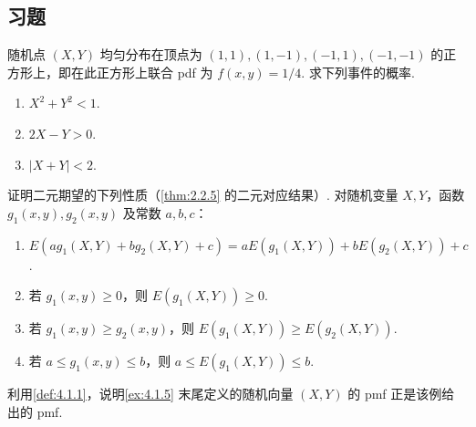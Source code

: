 \subsection{习题}\label{sec:4.8}
\setcounter{exercise}{0}
\begin{exercise}\label{exercise:4.1}
随机点 $(X,Y)$ 均匀分布在顶点为 $(1,1),(1,-1),(-1,1),(-1,-1)$ 的正方形上，即在此正方形上联合 pdf 为 $f(x,y)=1/4$. 求下列事件的概率.
\begin{enumerate}
\item[(a)] $X^2+Y^2<1$.
\item[(b)] $2X-Y>0$.
\item[(c)] $|X+Y|<2$.
\end{enumerate}
\end{exercise}
\begin{exercise}\label{exercise:4.2}
证明二元期望的下列性质（\autoref{thm:2.2.5} 的二元对应结果）. 对随机变量 $X,Y$，函数 $g_1(x,y),g_2(x,y)$ 及常数 $a,b,c$：
\begin{enumerate}
\item[(a)] $E(ag_1(X,Y)+bg_2(X,Y)+c)=aE(g_1(X,Y))+bE(g_2(X,Y))+c$.
\item[(b)] 若 $g_1(x,y)\ge0$，则 $E(g_1(X,Y))\ge0$.
\item[(c)] 若 $g_1(x,y)\ge g_2(x,y)$，则 $E(g_1(X,Y))\ge E(g_2(X,Y))$.
\item[(d)] 若 $a\le g_1(x,y)\le b$，则 $a\le E(g_1(X,Y))\le b$.
\end{enumerate}
\end{exercise}
\begin{exercise}\label{exercise:4.3}
利用\autoref{def:4.1.1}，说明\autoref{ex:4.1.5} 末尾定义的随机向量 $(X,Y)$ 的 pmf 正是该例给出的 pmf.
\end{exercise}

